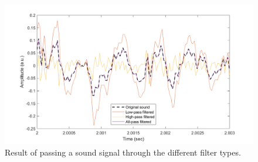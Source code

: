 \documentclass[journal]{IEEEtran}
\begin{document}

\begin{figure}[h]
    \centering
    \includegraphics[width=\columnwidth]{assignment_01/plots/filtered_sound.png}
    \caption{Result of passing a sound signal through the different filter types.}
    \label{fig:filtered_sound}
\end{figure}
\end{document}
